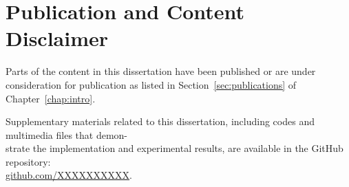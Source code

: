 \chapter*{Publication and Content Disclaimer}

Parts of the content in this dissertation have been published or are under consideration for publication as listed in Section~\ref{sec:publications} of Chapter~\ref{chap:intro}. 
\newline

\noindent Supplementary materials related to this dissertation, including codes and multimedia files that demon-\\strate the implementation and experimental results, are available in the GitHub repository: \\ \href{https://github.com/sanketlokhandegithub/PhDThesis}{github.com/XXXXXXXXXX}.




